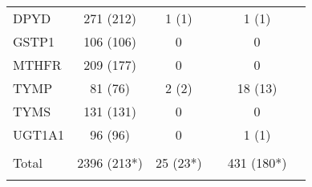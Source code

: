 \begin{table}[H]
\begin{tabular}{lcclcl}
				DPYD & 271 (212) & 1 (1) && 1 (1) \\
				\arrayrulecolor{evagrey}\hline
				GSTP1 & 106 (106) & 0 && 0 \\
				\hline
				MTHFR & 209 (177) & 0 && 0 \\
				\hline
				TYMP & 81 (76) & 2 (2) && 18 (13)\\
				\hline
				TYMS & 131 (131) & 0 && 0 \\
				\hline
				UGT1A1 & 96 (96) & 0 && 1 (1) \\
				\arrayrulecolor{black}\hline \\
				Total & 2396 (213*) & 25 (23*) && 431 (180*) \\
				\arrayrulecolor{black}\hline
      \end{tabular}
\end{table}
